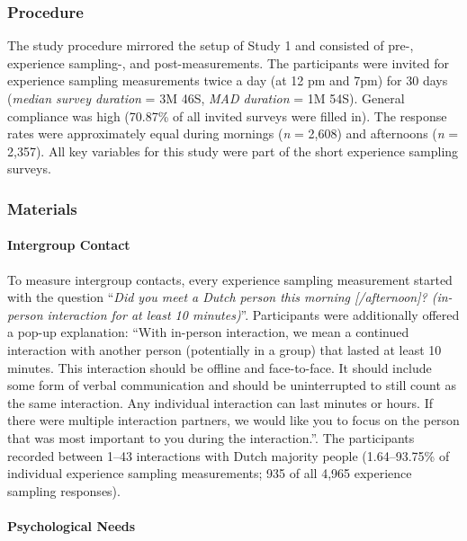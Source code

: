 \subsubsection{Procedure}

The study procedure mirrored the setup of Study 1 and consisted of pre-,
experience sampling-, and post-measurements. The participants were
invited for experience sampling measurements twice a day (at 12 pm and
7pm) for 30 days (\textit{median survey duration} = 3M 46S,
\textit{MAD duration} = 1M 54S). General compliance was high (70.87\% of
all invited surveys were filled in). The response rates were
approximately equal during mornings (\textit{n} = 2,608) and afternoons
(\textit{n} = 2,357). All key variables for this study were part of the
short experience sampling surveys.

\subsubsection{Materials}

\paragraph{Intergroup Contact}

To measure intergroup contacts, every experience sampling measurement
started with the question
``\textit{Did you meet a Dutch person this morning [/afternoon]? (in-person interaction for at least 10 minutes)}''.
Participants were additionally offered a pop-up explanation: ``With
in-person interaction, we mean a continued interaction with another
person (potentially in a group) that lasted at least 10 minutes. This
interaction should be offline and face-to-face. It should include some
form of verbal communication and should be uninterrupted to still count
as the same interaction. Any individual interaction can last minutes or
hours. If there were multiple interaction partners, we would like you to
focus on the person that was most important to you during the
interaction.''. The participants recorded between 1--43 interactions
with Dutch majority people (1.64--93.75\% of individual experience
sampling measurements; 935 of all 4,965 experience sampling responses).

\paragraph{Psychological Needs}

